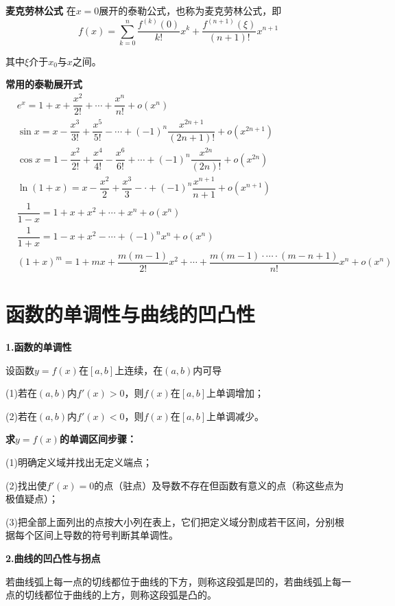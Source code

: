 \vspace{2mm}
\textbf{麦克劳林公式} \quad 在$x=0$展开的泰勒公式，也称为麦克劳林公式，即
\begin{equation}
    f(x)=\sum_{k=0}^n \dfrac{f^{(k)}(0)}{k!}x^k+
    \dfrac{f^{(n+1)}(\xi)}{(n+1)!}x^{n+1}
    \nonumber
\end{equation}

其中$\xi$介于$x_0$与$x$之间。

\textbf{常用的泰勒展开式}
\begin{equation}
    \begin{aligned}
        &e^x = 1+x+\dfrac{x^2}{2!}+\cdots+\dfrac{x^n}{n!}+o(x^n)\\
        &\sin x = x-\dfrac{x^3}{3!}+\dfrac{x^5}{5!}-\cdots+(-1)^n\dfrac{x^{2n+1}}{(2n+1)!}+o(x^{2n+1})\\
        &\cos x = 1-\dfrac{x^2}{2!}+\dfrac{x^4}{4!}-\dfrac{x^6}{6!}+\cdots+(-1)^n\dfrac{x^{2n}}{(2n)!}+o(x^{2n})\\
        &\ln(1+x) = x-\dfrac{x^2}{2}+\dfrac{x^3}{3}-\cdot+(-1)^n\dfrac{x^{n+1}}{n+1}+o(x^{n+1})\\
        &\dfrac{1}{1-x} = 1+x+x^2+\cdots+x^n+o(x^n)\\
        &\dfrac{1}{1+x} = 1-x+x^2-\cdots+(-1)^n x^n+o(x^n)\\
        &(1+x)^m = 1+mx+\dfrac{m(m-1)}{2!}x^2+\cdots+\dfrac{m(m-1)\cdot \cdots \cdot (m-n+1)}{n!}x^n+o(x^n)
    \end{aligned}
    \nonumber
\end{equation}

\section{函数的单调性与曲线的凹凸性}
\textbf{1.函数的单调性}

设函数$y=f(x)$在$[a,b]$上连续，在$(a,b)$内可导

(1)若在$(a,b)$内$f'(x)>0$，则$f(x)$在$[a,b]$上单调增加；

(2)若在$(a,b)$内$f'(x)<0$，则$f(x)$在$[a,b]$上单调减少。

\textbf{求$y=f(x)$的单调区间步骤：}

(1)明确定义域并找出无定义端点；

(2)找出使$f'(x)=0$的点（驻点）及导数不存在但函数有意义的点（称这些点为极值疑点）；

(3)把全部上面列出的点按大小列在表上，它们把定义域分割成若干区间，分别根据每个区间上导数的符号判断其单调性。

\textbf{2.曲线的凹凸性与拐点}
\begin{definition}[凹凸性的定义] \label{def:concave_up_down}
    若曲线弧上每一点的切线都位于曲线的下方，则称这段弧是凹的，若曲线弧上每一点的切线都位于曲线的上方，则称这段弧是凸的。
\end{definition}

